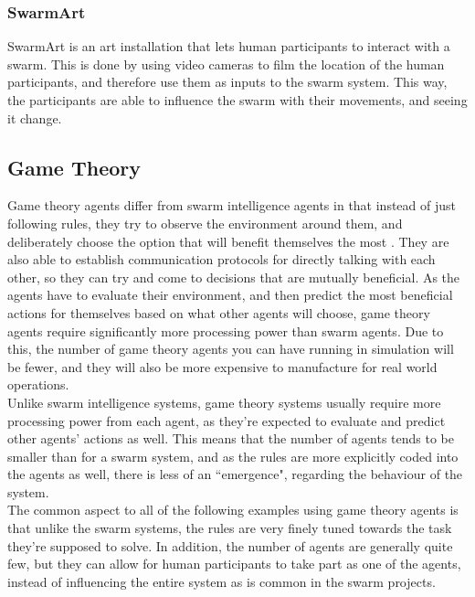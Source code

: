 \documentclass[a4paper,english]{report}
\begin{document}
	\subsubsection{SwarmArt}
	SwarmArt is an art installation that lets human participants to interact with a swarm. This is done by using video cameras to film the location of the human participants, and therefore use them as inputs to the swarm system. This way, the participants are able to influence the swarm with their movements, and seeing it change.
	\fi
	\subsection{Game Theory}
	Game theory agents differ from swarm intelligence agents in that instead of just following rules, they try to observe the environment around them, and deliberately choose the option that will benefit themselves the most \cite{wooldridge2009introduction}. They are also able to establish communication protocols for directly talking with each other, so they can try and come to decisions that are mutually beneficial. As the agents have to evaluate their environment, and then predict the most beneficial actions for themselves based on what other agents will choose, game theory agents require significantly more processing power than swarm agents. Due to this, the number of game theory agents you can have running in simulation will be fewer, and they will also be more expensive to manufacture for real world operations.\\
	Unlike swarm intelligence systems, game theory systems usually require more processing power from each agent, as they're expected to evaluate and predict other agents' actions as well. This means that the number of agents tends to be smaller than for a swarm system, and as the rules are more explicitly coded into the agents as well, there is less of an ``emergence", regarding the behaviour of the system.\\
	The common aspect to all of the following examples using game theory agents is that unlike the swarm systems, the rules are very finely tuned towards the task they're supposed to solve. In addition, the number of agents are generally quite few, but they can allow for human participants to take part as one of the agents, instead of influencing the entire system as is common in the swarm projects.	
	
\end{document}
